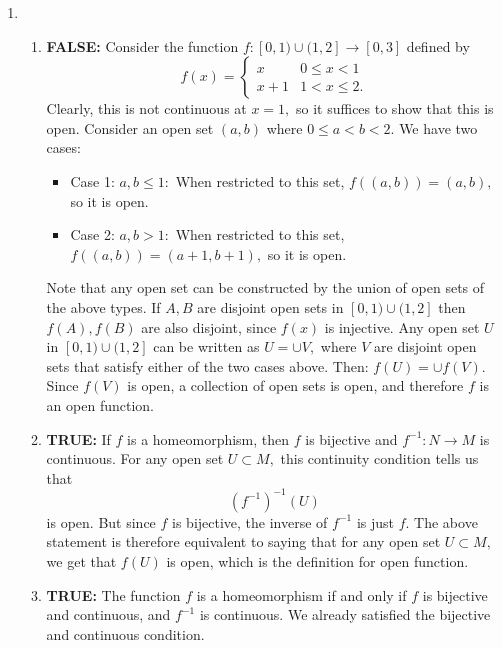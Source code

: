 \documentclass{article}
\numberwithin{equation}{section}
\begin{document}
\begin{enumerate}
\begin{enumerate}
    \end{enumerate}
    \item \begin{enumerate}[label=(\alph*)]
        \item \textbf{FALSE:} Consider the function $f:[0,1) \cup (1,2] \to [0,3]$ defined by 
        \begin{equation*}
            f(x) = \begin{cases}
                x & 0 \le x < 1 \\ 
                x + 1 & 1 < x \le 2.
            \end{cases}
        \end{equation*}
        Clearly, this is not continuous at $x=1,$ so it suffices to show that this is open. Consider an open set $(a,b)$ where $0 \le a < b< 2.$ We have two cases:
        \begin{itemize}
            \item Case 1: $a,b \le 1:$ When restricted to this set, $f((a,b))=(a,b),$ so it is open.
            \item Case 2: $a,b > 1:$ When restricted to this set, $f((a,b))=(a+1,b+1),$ so it is open.
        \end{itemize}
        Note that any open set can be constructed by the union of open sets of the above types. If $A,B$ are disjoint open sets in $[0,1)\cup (1,2]$ then $f(A),f(B)$ are also disjoint, since $f(x)$ is injective. Any open set $U$ in $[0,1)\cup (1,2]$ can be written as $U = \cup V,$ where $V$ are disjoint open sets that satisfy either of the two cases above. Then:
        $f(U)=\cup f(V).$ Since $f(V)$ is open, a collection of open sets is open, and therefore $f$ is an open function.
        \item \textbf{TRUE:} If $f$ is a homeomorphism, then $f$ is bijective and $f^{-1}:N\to M$ is continuous. For any open set $U\subset M,$ this continuity condition tells us that 
        \begin{equation*}
            \left(f^{-1}\right)^{-1}(U) 
        \end{equation*}
        is open. But since $f$ is bijective, the inverse of $f^{-1}$ is just $f.$ The above statement is therefore equivalent to saying that for any open set $U\subset M,$ we get that $f(U)$ is open, which is the definition for open function.
        \item \textbf{TRUE:} The function $f$ is a homeomorphism if and only if $f$ is bijective and continuous, and $f^{-1}$ is continuous. We already satisfied the bijective and continuous condition.
        

\end{enumerate}
\end{enumerate}
\end{document}
